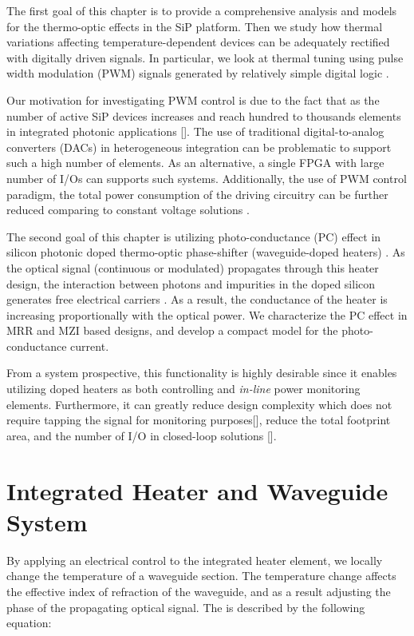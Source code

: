 The first goal of this chapter is to provide a comprehensive analysis and models for the thermo-optic effects in the SiP platform. Then we study how thermal variations affecting temperature-dependent devices can be adequately rectified with digitally driven signals. In particular, we look at thermal tuning using pulse width modulation (PWM) signals generated by relatively simple digital logic \cite{matsuura2017accelerating, zecevic2015integrated, aguinaldo2014wideband}. 

Our motivation for investigating PWM control is due to the fact that as the number of active SiP devices increases and reach hundred to thousands elements in integrated photonic applications []. The use of traditional digital-to-analog converters (DACs) in heterogeneous integration can be problematic to support such a high number of elements. As an alternative, a single FPGA with large number of I/Os can supports such systems. Additionally, the use of PWM control paradigm, the total power consumption of the driving circuitry can be further reduced comparing to constant voltage solutions \cite{zecevic2015integrated}. 

The second goal of this chapter is utilizing photo-conductance (PC) effect in silicon photonic doped thermo-optic phase-shifter (waveguide-doped heaters) \cite{Harris_heater}. As the optical signal (continuous or modulated) propagates through this heater design, the interaction between photons and impurities in the doped silicon generates free electrical carriers \cite{jayatilleka2019photoconductive}. As a result, the conductance of the heater is increasing proportionally with the optical power. We characterize the PC effect in MRR and MZI based designs, and develop a compact model for the photo-conductance current. 

From a system prospective, this functionality is highly desirable since it enables utilizing doped heaters as both controlling and \textit{in-line} power monitoring elements. Furthermore, it can greatly reduce design complexity which does not require tapping the signal for monitoring purposes[], reduce the total footprint area, and the number of I/O in closed-loop solutions [].

\section{Integrated Heater and Waveguide System}

By applying an electrical control to the integrated heater element, we locally change the temperature of a waveguide section. The temperature change affects the effective index of refraction of the waveguide, and as a result adjusting the phase of the propagating optical signal. The is described by the following equation:

